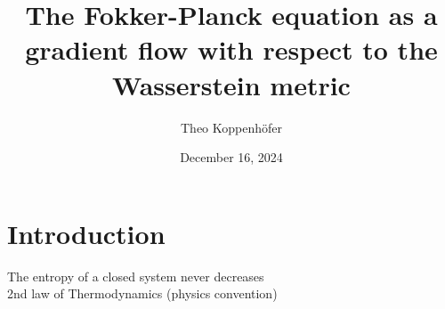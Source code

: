 


\usepackage[utf8]{inputenc}


\title{The Fokker-Planck equation as a gradient flow with respect to the Wasserstein metric}
\author{Theo Koppenhöfer}
\date{December 16, 2024}





\graphicspath{{./Figures/}}
\graphicspath{{./images/}}
\usepackage{import}



\tikzexternaldisable


\usepackage{transparent}






\frame[plain]{\titlepage}


\section{Introduction}

{
\begin{frame}[plain]
	\begin{center}
		\Large{{The entropy of a closed system never decreases}} \\
    \vspace{1em}
    \footnotesize{{\hfill 2nd law of Thermodynamics (physics convention)}}
	\end{center}
\end{frame}
}

